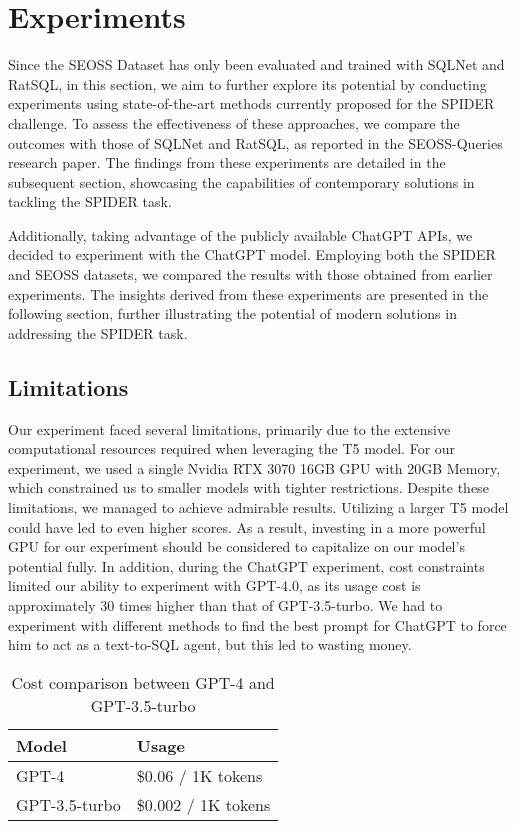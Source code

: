 \section{Experiments}

Since the SEOSS Dataset\cite{RATH2019104005} has only been evaluated and trained with SQLNet and RatSQL, in this section, we aim to further explore its potential by conducting experiments using state-of-the-art methods currently proposed for the SPIDER challenge. To assess the effectiveness of these approaches, we compare the outcomes with those of SQLNet and RatSQL, as reported in the SEOSS-Queries research paper\cite{TOMOVA2022108211}. The findings from these experiments are detailed in the subsequent section, showcasing the capabilities of contemporary solutions in tackling the SPIDER task.

Additionally, taking advantage of the publicly available ChatGPT APIs, we decided to experiment with the ChatGPT model. Employing both the SPIDER and SEOSS datasets, we compared the results with those obtained from earlier experiments. The insights derived from these experiments are presented in the following section, further illustrating the potential of modern solutions in addressing the SPIDER task.

\subsection{Limitations}

Our experiment faced several limitations, primarily due to the extensive computational resources required when leveraging the T5 model. For our experiment, we used a single Nvidia RTX 3070 16GB GPU with 20GB Memory, which constrained us to smaller models with tighter restrictions. Despite these limitations, we managed to achieve admirable results. Utilizing a larger T5 model could have led to even higher scores. As a result, investing in a more powerful GPU for our experiment should be considered to capitalize on our model's potential fully.
In addition, during the ChatGPT experiment, cost constraints limited our ability to experiment with GPT-4.0, as its usage cost is approximately 30 times higher than that of GPT-3.5-turbo. We had to experiment with different methods to find the best prompt for ChatGPT to force him to act as a text-to-SQL agent, but this led to wasting money.

\begin{table}[h]
    \centering
    \begin{tabular}{|l|l|}
        \hline \textbf{Model} & \textbf{Usage}      \\
        \hline GPT-4          & \$0.06 / 1K tokens  \\
        \hline GPT-3.5-turbo  & \$0.002 / 1K tokens \\
        \hline
    \end{tabular}
    \caption{Cost comparison between GPT-4 and GPT-3.5-turbo}
    \label{tab:cost_comparison}
\end{table}



\clearpage


\clearpage